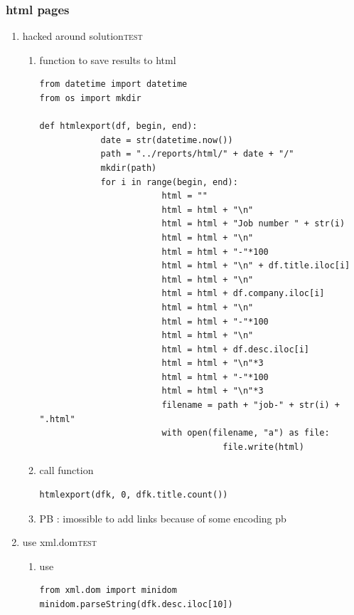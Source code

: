 \documentclass[11pt]{article}
\begin{document}
\subsubsection{html pages}
\label{sec:org98b0b74}
\begin{enumerate}
\item hacked around solution\hfill{}\textsc{test}
\label{sec:orgb7a00af}
\begin{enumerate}
\item function to save results to html
\label{sec:orgd1fea2c}
\begin{verbatim}
from datetime import datetime
from os import mkdir

def htmlexport(df, begin, end):
            date = str(datetime.now())
            path = "../reports/html/" + date + "/"
            mkdir(path)
            for i in range(begin, end):
                        html = ""
                        html = html + "\n"
                        html = html + "Job number " + str(i)
                        html = html + "\n"
                        html = html + "-"*100
                        html = html + "\n" + df.title.iloc[i]
                        html = html + "\n"
                        html = html + df.company.iloc[i]
                        html = html + "\n"
                        html = html + "-"*100
                        html = html + "\n"
                        html = html + df.desc.iloc[i]
                        html = html + "\n"*3
                        html = html + "-"*100
                        html = html + "\n"*3
                        filename = path + "job-" + str(i) + ".html"
                        with open(filename, "a") as file:
                                    file.write(html)
\end{verbatim}

\item call function
\label{sec:org0adea7d}
\begin{verbatim}
htmlexport(dfk, 0, dfk.title.count())
\end{verbatim}
\item PB : imossible to add links because of some encoding pb
\label{sec:orgd32fafa}
\end{enumerate}
\item use xml.dom\hfill{}\textsc{test}
\label{sec:org2686abf}
\begin{enumerate}
\item use
\label{sec:orgaf1768d}
\begin{verbatim}
from xml.dom import minidom
minidom.parseString(dfk.desc.iloc[10])
\end{verbatim}


\end{enumerate}
\end{enumerate}
\end{document}
